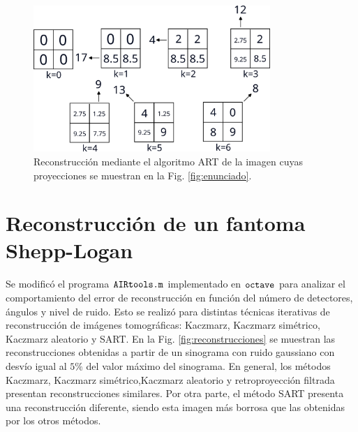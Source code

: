 \documentclass[letterpaper,12pt]{article}
\theoremstyle{plain}
\begin{document}
\begin{figure}[H]
   \centering
         \includegraphics[width=0.8\textwidth]{Figuras/ej1_sol.png}
   \caption{Reconstrucción mediante el algoritmo ART de la imagen cuyas proyecciones se muestran en la Fig. \ref{fig:enunciado}.}
   \label{fig:solej1}
\end{figure}

\newpage

\section{Reconstrucción de un fantoma Shepp-Logan}

Se modificó el programa $\verb|AIRtools.m|$ implementado en $\verb|octave|$ para analizar el comportamiento del error de reconstrucción en función del número de detectores, ángulos y nivel de ruido. Esto se realizó para distintas técnicas iterativas de reconstrucción de imágenes tomográficas: Kaczmarz, Kaczmarz simétrico, Kaczmarz aleatorio y SART. En la Fig. \ref{fig:reconstrucciones} se muestran las reconstrucciones obtenidas a partir de un sinograma con ruido gaussiano con desvío igual al $5\%$ del valor máximo del sinograma. En general, los métodos Kaczmarz, Kaczmarz simétrico,Kaczmarz aleatorio y retroproyección filtrada presentan reconstrucciones similares. Por otra parte, el método SART presenta una reconstrucción diferente, siendo esta imagen más borrosa que las obtenidas por los otros métodos.
\end{document}
